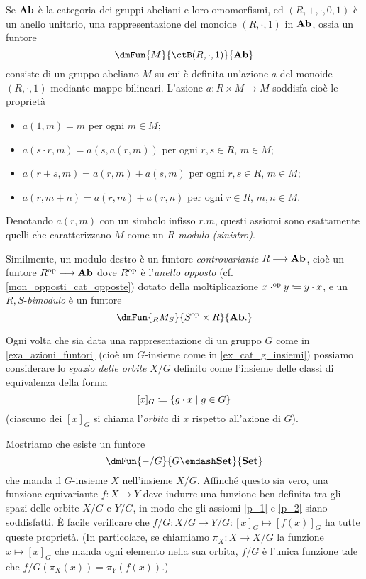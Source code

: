 \begin{example}
	Se \(\mathbf{Ab}\) è la categoria dei gruppi abeliani e loro omomorfismi, ed \((R,+,\cdot,0,1)\) è un anello unitario, una rappresentazione del monoide \((R,\cdot,1)\) in \(\mathbf{Ab}\), ossia un funtore
	\[\dmFun{M}{\ctB(R,\cdot,1)}{\ctAb}\]
	consiste di un gruppo abeliano \(M\) su cui è definita un'azione \(a\) del monoide \((R,\cdot,1)\) mediante mappe bilineari. L'azione \(a : R\times M\to M\) soddisfa cioè le proprietà
	\begin{itemize}
		\item \(a(1,m)=m\) per ogni \(m\in M\);
		\item \(a(s\cdot r,m)=a(s,a(r,m))\) per ogni \(r,s\in R\), \(m\in M\);
		\item \(a(r+s,m) = a(r,m) + a(s,m)\) per ogni \(r,s\in R\), \(m\in M\);
		\item \(a(r,m+n) = a(r,m) + a(r,n)\) per ogni \(r\in R\), \(m,n\in M\).
	\end{itemize}
	Denotando \(a(r,m)\) con un simbolo infisso \(r.m\), questi assiomi sono esattamente quelli che caratterizzano \(M\) come un \emph{\(R\)-modulo (sinistro)}.

	Similmente, un modulo destro è un funtore \emph{controvariante} \(R\longrightarrow\mathbf{Ab}\), cioè un funtore \(R^{\text{op}}\longrightarrow\mathbf{Ab}\) dove \(R^{\text{op}}\) è l'\emph{anello opposto} (cf. \ref{mon_opposti_cat_opposte}) dotato della moltiplicazione \(x\cdot^{\text{op}} y \coloneqq y\cdot x\), e un \(R,S\)-\emph{bimodulo} è un funtore
	\[\dmFun{{}_RM_S}{S^\op\times R}{\ctAb.}\]
\end{example}
\begin{example}
	Ogni volta che sia data una rappresentazione di un gruppo \(G\) come in \ref{exa_azioni_funtori} (cioè un \(G\)-insieme come in \ref{ex_cat_g_insiemi}) possiamo considerare lo \emph{spazio delle orbite} \(X/G\) definito come l'insieme delle classi di equivalenza della forma
	\[[x]_G \coloneqq \{g\cdot x\mid g\in G\}\]
	(ciascuno dei \([x]_G\) si chiama l'\emph{orbita} di \(x\) rispetto all'azione di \(G\)).

	Mostriamo che esiste un funtore
	\[\dmFun{-/G}{G\emdash\ctSet}{\ctSet}\]
	che manda il \(G\)-insieme \(X\) nell'insieme \(X/G\). Affinché questo sia vero, una funzione equivariante \(f : X\to Y\) deve indurre una funzione ben definita tra gli spazi delle orbite \(X/G\) e \(Y/G\), in modo che gli assiomi \ref{p_1} e \ref{p_2} siano soddisfatti. \`E facile verificare che \(f/G : X/G \to Y/G : [x]_G\mapsto [f(x)]_G\) ha tutte queste proprietà. (In particolare, se chiamiamo \(\pi_X : X\to X/G\) la funzione \(x\mapsto [x]_G\) che manda ogni elemento nella sua orbita, \(f/G\) è l'unica funzione tale che \(f/G(\pi_X(x)) = \pi_Y(f(x))\).)
\end{example}
